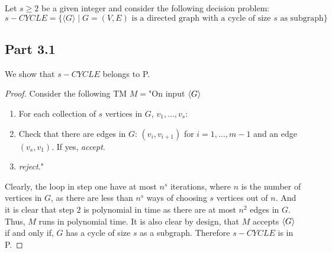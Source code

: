 \documentclass[a4paper,11pt]{article}
\numberwithin{equation}{section}
\begin{document}
	Let $s \geq 2$ be a given integer and consider the following decision problem:
	\begin{equation*}
		s-C Y C L E=\{\langle G\rangle \mid G=(V, E)\text{ is a directed graph with a cycle of size $s$ as subgraph}\}
	\end{equation*}
	\subsection*{Part 3.1}
	We show that $ s-CYCLE $ belongs to P.
	\begin{proof}
		Consider the following TM $ M= $"On input $ \braket{G} $\begin{enumerate}
			\item For each collection of $ s $ vertices in $ G $, $ v_1,...,v_s $:
			\item \begin{addmargin}[2em]{0em} Check that there are edges in $ G $: $(v_i,v_{i+1}) $ for $ i=1,...,m-1 $ and an edge $ (v_s,v_1) $. If yes, \emph{accept}.
			\end{addmargin}
			\item \emph{reject.}"
		\end{enumerate}
		Clearly, the loop in step one have at most $ n^s $ iterations, where $ n $ is the number of vertices in $ G $, as there are less than $ n^s $ ways of choosing $ s $ vertices out of $ n $. And it is clear that step $ 2 $ is polynomial in time as there are at most $ n^2 $ edges in $ G $. Thus, $M $ runs in polynomial time. It is also clear by design, that $ M $ accepts $ \braket{G} $ if and only if, $ G $ has a cycle of size $ s $ as a subgraph. Therefore $ s-CYCLE $ is in P.
		

\end{proof}
\end{document}
